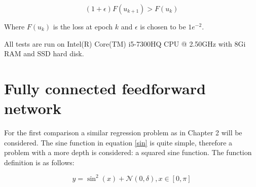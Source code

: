 \begin{equation}
(1+\epsilon)F(u_{k+1}) > F(u_k)
\end{equation}

Where $F(u_k)$ is the loss at epoch $k$ and $\epsilon$ is chosen to be $1e^{-2}$.

All tests are run on Intel(R) Core(TM) i5-7300HQ CPU @ 2.50GHz with 8Gi RAM and SSD hard disk. 

\section{Fully connected feedforward network}
For the first comparison a similar regression problem as in Chapter 2 will be considered. The sine function in equation \ref{sin} is quite simple, therefore a problem with a more depth is considered: a squared sine function. The function definition is as follows: 

\begin{equation}
y = \sin^2(x) + \mathcal N(0,\delta), x \in [0,\pi]
\label{sin2}
\end{equation}

